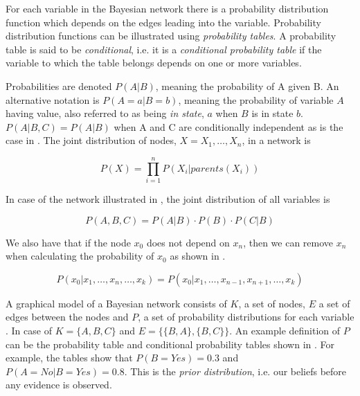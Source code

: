 For each variable in the Bayesian network there is a probability distribution function which depends on the edges leading into the variable. Probability distribution functions can be illustrated using \emph{probability tables}. A probability table is said to be \emph{conditional}, i.e. it is a \emph{conditional probability table} if the variable to which the table belongs depends on one or more variables.

Probabilities are denoted $P(A|B)$, meaning the probability of A given B. An alternative notation is $P(A=a|B=b)$, meaning the probability of variable $A$ having value, also referred to as being \emph{in state}, $a$ when $B$ is in state $b$. $P(A|B,C) = P(A|B)$ when A and C are conditionally independent as is the case in . The joint distribution of nodes, $X = X_1,\ldots,X_n$, in a network is

\begin{equation}
\label{eq:analysis:bayesian-network:prod}
P(X) = \displaystyle \prod_{i=1}^{n} P(X_i|parents(X_i))
\end{equation}

In case of the network illustrated in , the joint distribution of all variables is

\begin{equation}
P(A, B, C) = P(A|B) \cdot P(B) \cdot P(C|B)
\end{equation}

We also have that if the node $x_0$ does not depend on $x_n$, then we can remove $x_n$ when calculating the probability of $x_0$ as shown in  \cite{stephenson2000introduction}.

\begin{equation}
\label{eq:analysis:bayesian-network:not-child}
P(x_0|x_1,\ldots,x_n,\ldots,x_k) = P(x_0|x_1,\ldots,x_{n-1},x_{n+1},\ldots,x_k)
\end{equation}

A graphical model of a Bayesian network consists of $K$, a set of nodes, $E$ a set of edges between the nodes and $P$, a set of probability distributions for each variable \cite{stephenson2000introduction}. In case of  $K = \{A, B, C\}$ and $E = \{\{B, A\}, \{B,C\}\}$. An example definition of $P$ can be the probability table and conditional probability tables shown in . For example, the tables show that $P(B=Yes) = 0.3$ and $P(A=No|B=Yes) = 0.8$. This is the \emph{prior distribution}, i.e. our beliefs before any evidence is observed.

